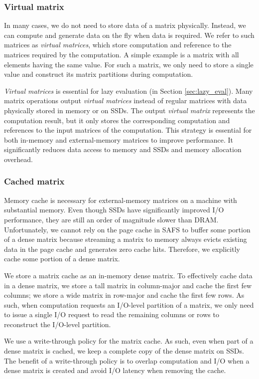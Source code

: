 \subsubsection{Virtual matrix} \label{virt_mat}
In many cases, we do not need to store data of a matrix physically. Instead,
we can compute and generate data on the fly when data is required. We refer
to such matrices as \textit{virtual matrices}, which store computation and
reference to the matrices required by the computation. A simple example is
a matrix with
all elements having the same value. For such a matrix, we only need to store
a single value and construct its matrix partitions during computation.

\textit{Virtual matrices} is essential for lazy evaluation (in Section
\ref{sec:lazy_eval}). Many matrix operations output \textit{virtual matrices}
instead of regular matrices with data physically stored in memory or on SSDs.
The output \textit{virtual matrix} represents the computation result, but it
only stores the corresponding computation and references to the input matrices
of the computation. This strategy is essential for both in-memory and
external-memory matrices to improve performance. It significantly reduces data
access to memory and SSDs and memory allocation overhead.

\subsubsection{Cached matrix}
Memory cache is necessary for external-memory matrices on a machine with
substantial memory.
Even though SSDs have significantly improved I/O performance, they are still
an order of magnitude slower than DRAM. Unfortunately, we cannot rely on
the page cache in SAFS \cite{sa-cache} to buffer some portion of a dense matrix
because streaming a matrix to memory always evicts existing data in the page
cache and generates zero cache hits. Therefore, we explicitly cache some portion
of a dense matrix.

We store a matrix cache as an in-memory dense matrix.
To effectively cache data in a dense matrix, we store a tall matrix in
column-major and cache the first few columns; we store a wide matrix in row-major
and cache the first few rows. As such, when computation requests an I/O-level
partition of a matrix, we only need to issue a single I/O request to read
the remaining columns or rows to reconstruct the I/O-level partition.

We use a write-through policy for the matrix cache. As such, even when part of
a dense matrix is cached, we keep a complete copy of the dense matrix on SSDs.
The benefit of a write-through policy is to overlap computation and I/O when
a dense matrix is created and avoid I/O latency when removing the cache.

